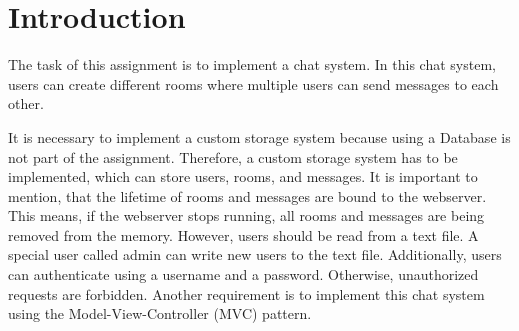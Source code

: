 \section{Introduction}\label{sec:01_intro}
The task of this assignment is to implement a chat system. In this chat system, users can create different rooms where multiple users can send messages to each other.

It is necessary to implement a custom storage system because using a Database is not part of the assignment.
Therefore, a custom storage system has to be implemented, which can store users, rooms, and messages. It is important to mention, that the lifetime of rooms and messages are bound to the webserver. This means, if the webserver stops running, all rooms and messages are being removed from the memory. However, users should be read from a text file. A special user called admin can write new users to the text file.
Additionally, users can authenticate using a username and a password. Otherwise, unauthorized requests are forbidden.
Another requirement is to implement this chat system using the Model-View-Controller (MVC) pattern.
